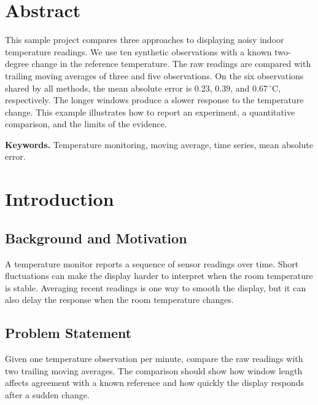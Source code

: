\documentclass[12pt,a4paper]{report}
\newcommand{\supervisorName}{Name of supervisor}
\newif\ifshowFigureList
\newif\ifshowTableList
\begin{document}

\chapter*{Abstract}

This sample project compares three approaches to displaying noisy indoor
temperature readings. We use ten synthetic observations with a known
two-degree change in the reference temperature. The raw readings are
compared with trailing moving averages of three and five observations.
On the six observations shared by all methods, the mean absolute error
is \(0.23\), \(0.39\), and \(0.67\,^{\circ}\mathrm{C}\), respectively.
The longer windows produce a slower response to the temperature change.
This example illustrates how to report an experiment, a quantitative
comparison, and the limits of the evidence.

\medskip
\noindent\textbf{Keywords.} Temperature monitoring, moving average,
time series, mean absolute error.

\tableofcontents
\ifshowFigureList
  \listoffigures
\fi
\ifshowTableList
  \listoftables
\fi

\clearpage
{}

\chapter{Introduction}

\section{Background and Motivation}

A temperature monitor reports a sequence of sensor readings over time.
Short fluctuations can make the display harder to interpret when the
room temperature is stable. Averaging recent readings is one way to
smooth the display, but it can also delay the response when the room
temperature changes.

\section{Problem Statement}

Given one temperature observation per minute, compare the raw readings
with two trailing moving averages. The comparison should show how
window length affects agreement with a known reference and how quickly
the display responds after a sudden change.
\end{document}
